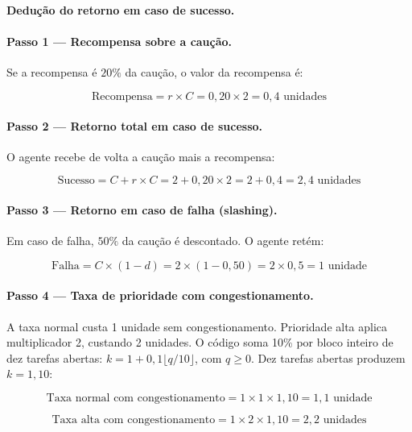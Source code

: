 \begin{metodo}
\textbf{Dedução do retorno em caso de sucesso.}

\paragraph{Passo 1 — Recompensa sobre a caução.}
Se a recompensa é $20\%$ da caução, o valor da recompensa é:

\[
\text{Recompensa} = r \times C = 0{,}20 \times 2 = 0{,}4 \text{ unidades}
\]

\paragraph{Passo 2 — Retorno total em caso de sucesso.}
O agente recebe de volta a caução mais a recompensa:

\[
\boxed{\text{Sucesso} = C + r \times C = 2 + 0{,}20 \times 2 = 2 + 0{,}4 = 2{,}4 \text{ unidades}}
\]

\paragraph{Passo 3 — Retorno em caso de falha (slashing).}
Em caso de falha, $50\%$ da caução é descontado. O agente retém:

\[
\boxed{\text{Falha} = C \times (1 - d) = 2 \times (1 - 0{,}50) = 2 \times 0{,}5 = 1 \text{ unidade}}
\]

\paragraph{Passo 4 — Taxa de prioridade com congestionamento.}
A taxa normal custa 1 unidade sem congestionamento. Prioridade alta aplica multiplicador 2, custando 2 unidades. O código soma 10\% por bloco inteiro de dez tarefas abertas: $k=1+0{,}1\lfloor q/10\rfloor$, com $q\geq0$. Dez tarefas abertas produzem $k=1{,}10$:

\[
\text{Taxa normal com congestionamento} = 1 \times 1 \times 1{,}10 = 1{,}1 \text{ unidade}
\]

\[
\text{Taxa alta com congestionamento} = 1 \times 2 \times 1{,}10 = 2{,}2 \text{ unidades}
\]

\end{metodo}

